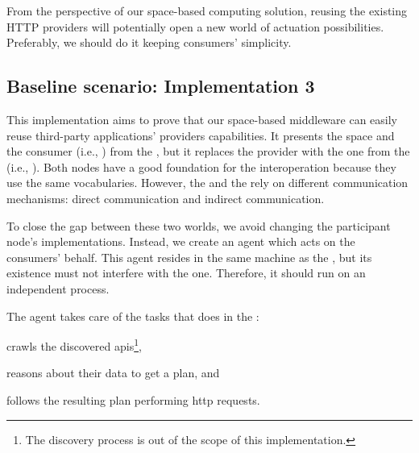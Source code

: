 From the perspective of our space-based computing solution, reusing the existing HTTP providers will potentially open a new world of actuation possibilities.
Preferably, we should do it keeping \spaceActuation{} consumers' simplicity. %




\subsection{Baseline scenario: Implementation 3}
\label{sec:actuation_scn3}
\newcommand{\implMix}{\emph{Implementation 3}}

This implementation aims to prove that our space-based middleware can easily reuse third-party applications' providers capabilities. %
It presents the space and the consumer (i.e., \nodeConsSpace{}) from the \implSpace{}, but it replaces the provider with the one from the \implRest{} (i.e., \nodeProvRest{}).
Both nodes have a good foundation for the interoperation because they use the same vocabularies. %
However, the \nodeProvRest{} and the \nodeConsSpace{} rely on different communication mechanisms: direct communication and indirect communication.


To close the gap between these two worlds, we avoid changing the participant node's implementations.
Instead, we create an agent which acts on the consumers' behalf. %
This agent resides in the same machine as the \Space{}, but its existence must not interfere with the \Space{} one. %
Therefore, it should run on an independent process.


The agent takes care of the tasks that \nodeConsRest{} does in the \implRest:
\begin{enumerate*}[label=\itshape(\arabic*\upshape)]
  \item crawls the discovered \acsp{api}\footnote{The discovery process is out of the scope of this implementation.},
  \item reasons about their data to get a plan, and
  \item follows the resulting plan performing \acs{http} requests.
\end{enumerate*}


